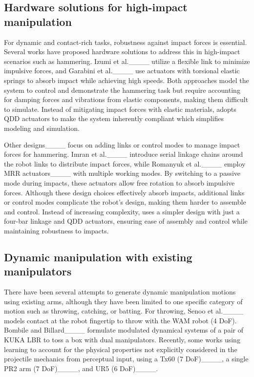 \subsection{Hardware solutions for high-impact manipulation}

For dynamic and contact-rich tasks, robustness against impact forces is essential. Several works have proposed hardware solutions to address this in high-impact scenarios such as hammering. Izumi et al.____ utilize a flexible link to minimize impulsive forces, and Garabini et al.____ use actuators with torsional elastic springs to absorb impact while achieving high speeds. 
Both approaches model the system to control and demonstrate the hammering task but require accounting for damping forces and vibrations from elastic components, making them difficult to simulate.
Instead of mitigating impact forces with elastic materials, \robot adopts QDD actuators to make the system inherently compliant which simplifies modeling and simulation.

Other designs____ focus on adding links or control modes to manage impact forces for hammering. Imran et al.____ introduce serial linkage chains around the robot links to distribute impact forces, while Romanyuk et al.____ employ MRR actuators____ with multiple working modes. By switching to a passive mode during impacts, these actuators allow free rotation to absorb impulsive forces. Although these design choices effectively absorb impacts, additional links or control modes complicate the robot’s design, making them harder to assemble and control. Instead of increasing complexity, \robot uses a simpler design with just a four-bar linkage and QDD actuators, ensuring ease of assembly and control while maintaining robustness to impacts.

\subsection{Dynamic manipulation with existing manipulators}
There have been several attempts to generate dynamic manipulation motions using existing arms, although they have been limited to one specific category of motion such as throwing, catching, or batting. For throwing, Senoo et al.____ models contact at the robot fingertip to throw with the WAM robot (4 DoF). Bombile and Billard____ formulate modulated dynamical systems of a pair of KUKA LBR to toss a box with dual manipulators. Recently, some works using learning to account for the physical properties not explicitly considered in the projectile mechanics from perceptual input, using a Tx60 (7 DoF)____, a single PR2 arm (7 DoF)____, and UR5 (6 DoF)____. 

